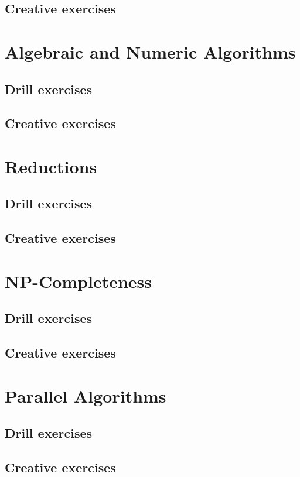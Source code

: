 \documentclass[a4paper,11pt]{memoir}
\begin{document}
    \section*{Creative exercises}

    \chapter{Algebraic and Numeric Algorithms}
    \section*{Drill exercises}
    \section*{Creative exercises}

    \chapter{Reductions}
    \section*{Drill exercises}
    \section*{Creative exercises}

    \chapter{NP-Completeness}
    \section*{Drill exercises}
    \section*{Creative exercises}

    \chapter{Parallel Algorithms}
    \section*{Drill exercises}
    \section*{Creative exercises}
\end{document}
